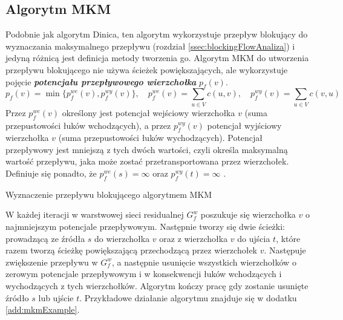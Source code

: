 \subsection{Algorytm MKM}\label{ssec:mkmAnaliza}
Podobnie jak algorytm Dinica, ten algorytm wykorzystuje przepływ blokujący do wyznaczania maksymalnego przepływu (rozdział  \ref{ssec:blockingFlowAnaliza}) i jedyną różnicą jest definicja metody tworzenia go. Algorytm MKM do utworzenia przepływu blokującego nie używa ścieżek powiększających, ale wykorzystuje pojęcie \textit{\textbf{potencjału przepływowego wierzchołka}} $ p_f(v) $.
$$ p_f(v)=\min\{p_f^{we}(v),p_f^{wy}(v)\},\quad p_f^{we}(v)=\sum_{u\in V}{c(u,v)},\quad p_f^{wy}(v)=\sum_{u\in V}{c(v,u)} $$
Przez $ p_f^{we}(v) $ określony jest potencjał wejściowy wierzchołka $ v $ (suma przepustowości łuków wchodzących), a przez $ p_f^{wy}(v) $ potencjał wyjściowy wierzchołka $ v $ (suma przepustowości łuków wychodzących). Potencjał przepływowy jest mniejszą z tych dwóch wartości, czyli określa maksymalną wartość przepływu, jaka może zostać przetransportowana przez wierzchołek. Definiuje się ponadto, że $ p_f^{we}(s)=\infty $ oraz $ p_f^{wy}(t)=\infty $  \cite{id:ZaawansowaneAlgorytmy}.
\begin{algorithm}[H]
	\caption{Wyznaczenie przepływu blokującego algorytmem MKM}\label{mkmPseudo}
	\begin{algorithmic}
			\Repeat
		\EndProcedure
	\end{algorithmic}
\end{algorithm}\vfill
W każdej iteracji w warstwowej sieci residualnej $ G_f^w $ poszukuje się wierzchołka $ v $ o najmniejszym potencjale przepływowym. Następnie tworzy się dwie ścieżki: prowadzącą ze źródła $ s $ do wierzchołka $ v $ oraz z wierzchołka $ v $ do ujścia $ t $, które razem tworzą ścieżkę powiększającą przechodzącą przez wierzchołek $ v $. Następuje zwiększenie przepływu w $ G_f^w $, a następnie usunięcie wszystkich wierzchołków o zerowym potencjale przepływowym i w konsekwencji łuków wchodzących i wychodzących z tych wierzchołków. Algorytm kończy pracę gdy zostanie usunięte źródło $ s $ lub ujście $ t $. Przykładowe działanie algorytmu znajduje się w dodatku \ref{add:mkmExample}.

